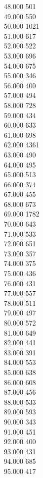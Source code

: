 { 48.000	501 \\
 49.000	550 \\
 50.000	1021 \\
 51.000	617 \\
 52.000	522 \\
 53.000	696 \\
 54.000	675 \\
 55.000	346 \\
 56.000	400 \\
 57.000	494 \\
 58.000	728 \\
 59.000	434 \\
 60.000	633 \\
 61.000	698 \\
 62.000	4361 \\
 63.000	490 \\
 64.000	495 \\
 65.000	513 \\
 66.000	374 \\
 67.000	455 \\
 68.000	673 \\
 69.000	1782 \\
 70.000	643 \\
 71.000	533 \\
 72.000	651 \\
 73.000	357 \\
 74.000	375 \\
 75.000	436 \\
 76.000	431 \\
 77.000	557 \\
 78.000	511 \\
 79.000	497 \\
 80.000	572 \\
 81.000	649 \\
 82.000	441 \\
 83.000	391 \\
 84.000	553 \\
 85.000	638 \\
 86.000	608 \\
 87.000	456 \\
 88.000	533 \\
 89.000	593 \\
 90.000	343 \\
 91.000	451 \\
 92.000	400 \\
 93.000	431 \\
 94.000	685 \\
 95.000	417 \\
}
